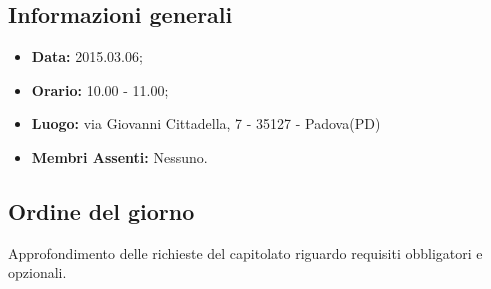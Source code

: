 \subsection{Informazioni generali}
\begin{itemize}
	\item \textbf{Data:} 2015.03.06;
	\item \textbf{Orario:} 10.00 - 11.00;
	\item \textbf{Luogo:} via Giovanni Cittadella, 7 - 35127 - Padova(PD)
	\item \textbf{Membri Assenti:} Nessuno.
\end{itemize}

\subsection{Ordine del giorno}
Approfondimento delle richieste del capitolato riguardo requisiti obbligatori e opzionali.

